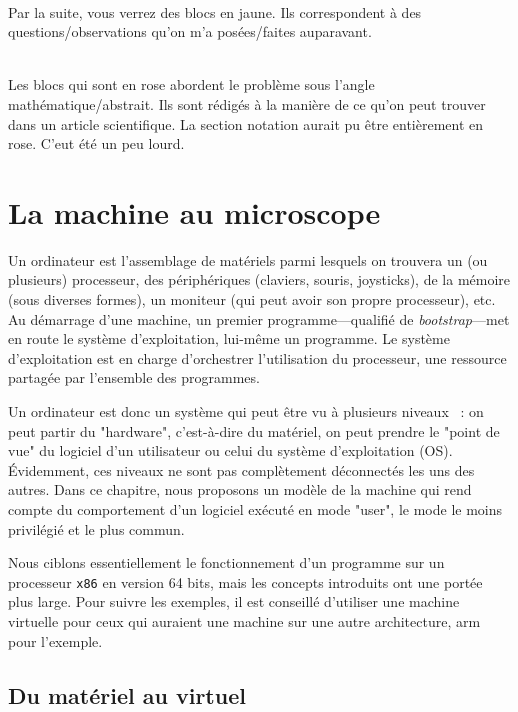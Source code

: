 \documentclass{book}
\newenvironment{commentaire}[1]{%
	\def\FrameCommand{\fboxrule=\FrameRule\fboxsep=\FrameSep \fcolorbox{yellow!50}{yellow!10}}%
	\MakeFramed {\advance\hsize-\width \FrameRestore}
	\noindent {\bf #1}\\
}%
{\endMakeFramed}
\newenvironment{formalisme}[1]{%
	\def\FrameCommand{\fboxrule=\FrameRule\fboxsep=\FrameSep \fcolorbox{red!10}{red!5}}%
	\MakeFramed {\advance\hsize-\width \FrameRestore}
	\noindent {\bf #1}\\
}%
{\endMakeFramed}
\newcommand{\xquatre}{{\tt x86}\xspace}
\begin{document}

\begin{commentaire}{Questions/observations}
	Par la suite, vous verrez des blocs en jaune. Ils correspondent à des questions/observations qu'on m'a posées/faites auparavant. 
\end{commentaire}

\begin{formalisme}{Formalisme}
	Les blocs qui sont en rose abordent le problème sous l'angle mathématique/abstrait. Ils sont rédigés à la manière de ce qu'on peut trouver dans un article scientifique. La section notation aurait pu être entièrement en rose. C'eut été un peu lourd.
\end{formalisme}


\chapter{La machine au microscope}

Un ordinateur est l'assemblage de matériels parmi lesquels on trouvera un (ou plusieurs) processeur, des périphériques (claviers, souris, joysticks), de la mémoire (sous diverses formes), un moniteur (qui peut avoir son propre processeur), etc. Au démarrage d'une machine, un premier programme---qualifié de \emph{bootstrap}---met en route le système d'exploitation, lui-même un programme. Le système d'exploitation est en charge d'orchestrer l'utilisation du processeur, une ressource partagée par l'ensemble des programmes. 

Un ordinateur est donc un système qui peut être vu à plusieurs niveaux~ : on peut partir du "hardware", c'est-à-dire du matériel, on peut prendre le "point de vue" du logiciel d'un utilisateur ou celui du système d'exploitation (OS). \'Evidemment, ces niveaux ne sont pas complètement déconnectés les uns des autres. Dans ce chapitre, nous proposons un modèle de la machine qui rend compte du comportement d'un logiciel exécuté en mode "user", le mode le moins privilégié et le plus commun.

Nous ciblons essentiellement le fonctionnement d'un programme sur un processeur \xquatre en version 64 bits, mais les concepts introduits ont une portée plus large. Pour suivre les exemples, il est conseillé d'utiliser une machine virtuelle pour ceux qui auraient une machine sur une autre architecture, {\sc arm} pour l'exemple. 


\section{Du matériel au virtuel}
\end{document}
